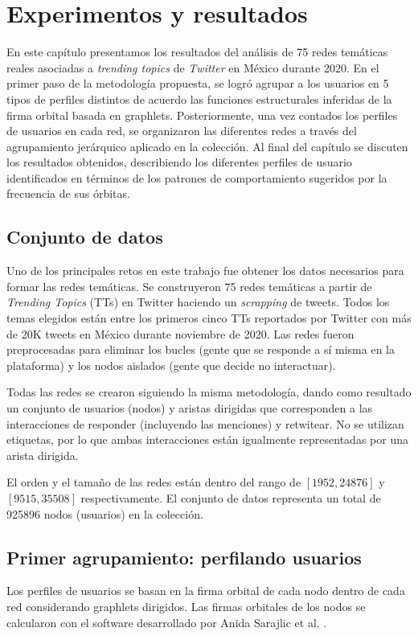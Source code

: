 \chapter{Experimentos y resultados}
\label{sec:experiments}

En este capítulo presentamos los resultados del análisis de 75 redes temáticas reales asociadas a \textit{trending topics} de \textit{Twitter} en México durante 2020. En el primer paso de la metodología propuesta, se logró agrupar a los usuarios en 5 tipos de perfiles distintos de acuerdo las funciones estructurales inferidas de la firma orbital basada en graphlets. Posteriormente, una vez contados los perfiles de usuarios en cada red, se organizaron las diferentes redes a través del agrupamiento jerárquico aplicado en la colección. Al final del capítulo se discuten los resultados obtenidos, describiendo los diferentes perfiles de usuario identificados en términos de los patrones de comportamiento sugeridos por la frecuencia de sus órbitas. 

\section{Conjunto de datos}
Uno de los principales retos en este trabajo fue obtener los datos necesarios para formar las redes temáticas. Se construyeron 75 redes temáticas a partir de \textit{Trending Topics} (TTs) en Twitter haciendo un \textit{scrapping} de tweets. Todos los temas elegidos están entre los primeros cinco TTs reportados por Twitter con más de 20K tweets en México durante noviembre de 2020. Las redes fueron preprocesadas para eliminar los bucles (gente que se responde a sí misma en la plataforma) y los nodos aislados (gente que decide no interactuar).

Todas las redes se crearon siguiendo la misma metodología, dando como resultado un conjunto de usuarios (nodos) y aristas dirigidas que corresponden a las interacciones de responder (incluyendo las menciones) y retwitear. No se utilizan etiquetas, por lo que ambas interacciones están igualmente representadas por una arista dirigida. 

El orden y el tamaño de las redes están dentro del rango de $[1952,24876]$ y $[9515,35508]$ respectivamente. El conjunto de datos representa un total de 925896 nodos (usuarios) en la colección.

\section{Primer agrupamiento: perfilando usuarios}
Los perfiles de usuarios se basan en la firma orbital de cada nodo dentro de cada red considerando graphlets dirigidos. Las firmas orbitales de los nodos se calcularon con el software desarrollado por Anida Sarajlic et al. \cite{sarajlic_graphlet-based_2016}. 


